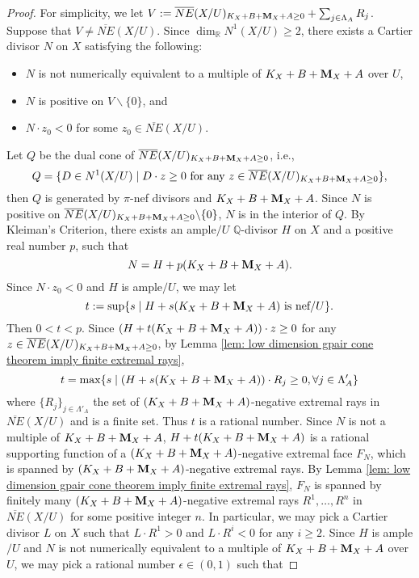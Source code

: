 \documentclass[11pt]{amsart}
\numberwithin{equation}{section}
\newcommand{\Mm}{{\bf{M}}}
\newcommand{\Qq}{\mathbb{Q}}
\newcommand{\Rr}{\mathbb{R}}
\theoremstyle{definition}
\theoremstyle{definition}
\theoremstyle{definition}
\begin{document}
\begin{proof}
For simplicity, we let $V:=\overline{NE}(X/U)_{K_X+B+\Mm_X+A\geq 0}+\sum_{j\in\Lambda_A}R_j$. Suppose that $V\not=\overline{NE}(X/U)$. Since $\dim_{\Rr}N^1(X/U)\geq 2$, there exists a Cartier divisor $N$ on $X$ satisfying the following:
\begin{itemize}
    \item $N$ is not numerically equivalent to a multiple of $K_X+B+\Mm_X+A$ over $U$,
    \item $N$ is positive on $V\backslash\{0\}$, and
    \item $N\cdot z_0<0$ for some $z_0\in\overline{NE}(X/U)$.
\end{itemize}
Let $Q$ be the dual cone of $\overline{NE}(X/U)_{K_X+B+\Mm_X+A\geq 0}$, i.e.,
$$Q=\{D\in N^1(X/U)\mid D\cdot z\geq 0\text{ for any }z\in\overline{NE}(X/U)_{K_X+B+\Mm_X+A\geq 0}\},$$
then $Q$ is generated by $\pi$-nef divisors and $K_X+B+\Mm_X+A$. Since $N$ is positive on $\overline{NE}(X/U)_{K_X+B+\Mm_X+A\geq 0}\backslash\{0\}$, $N$ is in the interior of $Q$. By Kleiman's Criterion, there exists an ample$/U$ $\Qq$-divisor $H$ on $X$ and a positive real number $p$, such that %
$$N=H+p(K_X+B+\Mm_X+A).$$
Since $N\cdot z_0<0$ and $H$ is ample$/U$, we may let
$$t:=\sup\{s\mid H+s(K_X+B+\Mm_X+A)\text{ is nef}/U\}.$$
Then $0<t<p$. Since $(H+t(K_X+B+\Mm_X+A))\cdot z\geq 0$ for any $z\in\overline{NE}(X/U)_{K_X+B+\Mm_X+A\geq 0}$, by Lemma \ref{lem: low dimension gpair cone theorem imply finite extremal rays},
$$t=\max\{s\mid (H+s(K_X+B+\Mm_X+A))\cdot R_j\geq 0,\forall j\in\Lambda_A'\}$$
where $\{R_j\}_{j\in\Lambda'_A}$ the set of $(K_X+B+\Mm_X+A)$-negative extremal rays in $\overline{NE}(X/U)$ and is a finite set. Thus $t$ is a rational number. Since $N$ is not a multiple of $K_X+B+\Mm_X+A$, $H+t(K_X+B+\Mm_X+A)$ is a rational supporting function of a $(K_X+B+\Mm_X+A)$-negative extremal face $F_N$, which is spanned by $(K_X+B+\Mm_X+A)$-negative extremal rays. By Lemma \ref{lem: low dimension gpair cone theorem imply finite extremal rays}, $F_N$ is spanned by finitely many $(K_X+B+\Mm_X+A)$-negative extremal rays $R^1,\dots,R^n$ in $\overline{NE}(X/U)$ for some positive integer $n$. In particular, we may pick a Cartier divisor $L$ on $X$ such that $L\cdot R^1>0$ and $L\cdot R^i<0$ for any $i\geq 2$. Since $H$ is ample$/U$ and $N$ is not numerically equivalent to a multiple of $K_X+B+\Mm_X+A$ over $U$, we may pick a rational number $\epsilon\in (0,1)$ such that

\end{proof}
\end{document}
